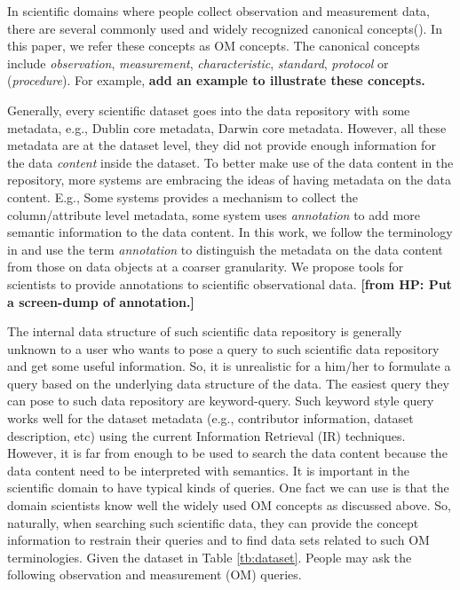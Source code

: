 \documentclass[conference]{IEEEtran}
\newcommand{\from}[2]{{\bf[{\sc from #1:} #2]}}
\begin{document}
In scientific domains where people collect observation and measurement
data, there are several commonly used and widely recognized canonical
concepts(\cite{oboe, om}). 
In this paper, we refer these concepts as OM concepts. 
The canonical concepts include {\em observation}, {\em measurement},
{\em characteristic}, {\em standard}, {\em protocol} or ({\em procedure}). 
For example, {\bf add an example to illustrate these concepts. }


Generally, every scientific dataset goes into the data repository with
some metadata, e.g., Dublin core metadata\cite{***}, Darwin core metadata\cite{***}. 
However, all these metadata are at the dataset level, they did not
provide enough information for the data {\em content} inside the
dataset. 
To better make use of the data content in the repository, more systems
are embracing the ideas of having metadata on the data content. 
E.g., Some systems \cite{tdar} provides a mechanism to collect the
column/attribute level metadata, some system \cite{semtools} uses
{\em annotation} to add more semantic information to the data
content. In this work, we follow the terminology in \cite{semtools} and
use the term {\em annotation} to distinguish the 
metadata on the data content from those on data objects at a coarser
granularity. 
We propose tools for scientists to provide annotations to scientific
observational data. 
\from{HP}{Put a screen-dump of annotation.}


The internal data structure of such scientific data repository is
generally unknown to a user who wants to pose a query to such scientific data
repository and get some useful information. 
So, it is unrealistic for a him/her to formulate a query based on the 
underlying data structure of the data.  
The easiest query they can pose to such data repository are keyword-query. 
Such keyword style query works well for the dataset metadata
(e.g., contributor information, dataset description, etc) using the
current Information Retrieval (IR) techniques. However, it
is far from enough to be used to search the data content because the
data content need to be interpreted with semantics. 
It is important in the scientific domain to have typical
kinds of queries. One fact we can use is that the domain
scientists know well the widely used OM concepts as discussed above. 
So, naturally, when searching such scientific data, they can provide
the concept information to restrain their queries and to find data sets
related to such OM terminologies. 
Given the dataset in Table \ref{tb:dataset}. 
People may ask the following observation and measurement (OM) queries. 
\end{document}
